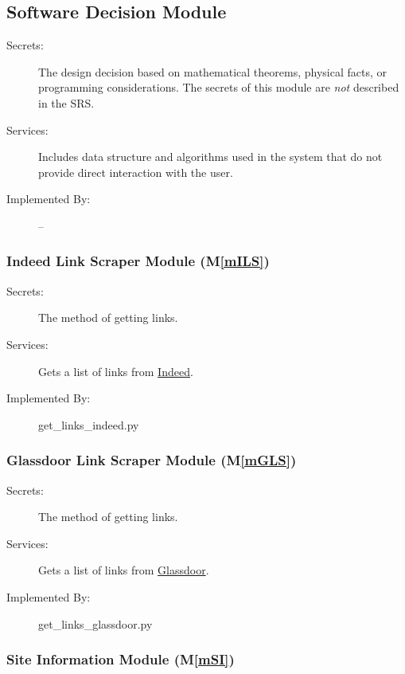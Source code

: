 \documentclass[12pt, titlepage]{article}
\newcommand{\mref}[1]{M\ref{#1}}
\begin{document}
\subsection{Software Decision Module}

\begin{description}
\item[Secrets:] The design decision based on mathematical theorems, physical
  facts, or programming considerations. The secrets of this module are
  \emph{not} described in the SRS.
\item[Services:] Includes data structure and algorithms used in the system that
  do not provide direct interaction with the user. 
\item[Implemented By:] --
\end{description}

\subsubsection{Indeed Link Scraper Module (\mref{mILS})}

\begin{description}
\item[Secrets:] The method of getting links.
\item[Services:] Gets a list of links from \href{https://indeed.com}{Indeed}.
\item[Implemented By:] get\_links\_indeed.py
\end{description}

\subsubsection{Glassdoor Link Scraper Module (\mref{mGLS})}

\begin{description}
\item[Secrets:] The method of getting links.
\item[Services:] Gets a list of links from \href{https://glassdoor.com}{Glassdoor}.
\item[Implemented By:] get\_links\_glassdoor.py
\end{description}

\subsubsection{Site Information Module (\mref{mSI})}
\end{document}
